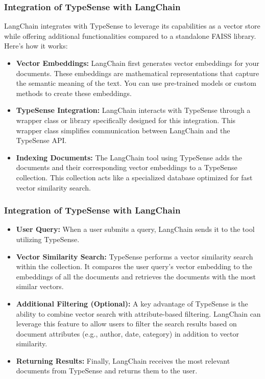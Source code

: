 \documentclass{beamer}
\begin{document}
	\begin{frame}
		\frametitle{Integration of TypeSense with LangChain}
		LangChain integrates with TypeSense to leverage its capabilities as a vector store while offering additional functionalities compared to a standalone FAISS library. Here's how it works:
		\begin{itemize}
			\item \textbf{Vector Embeddings:} LangChain first generates vector embeddings for your documents. These embeddings are mathematical representations that capture the semantic meaning of the text. You can use pre-trained models or custom methods to create these embeddings.
			\item \textbf{TypeSense Integration:} LangChain interacts with TypeSense through a wrapper class or library specifically designed for this integration. This wrapper class simplifies communication between LangChain and the TypeSense API.
			\item \textbf{Indexing Documents:} The LangChain tool using TypeSense adds the documents and their corresponding vector embeddings to a TypeSense collection. This collection acts like a specialized database optimized for fast vector similarity search.
		\end{itemize}
	\end{frame}

	\begin{frame}
		\frametitle{Integration of TypeSense with LangChain}
	
		\begin{itemize}
			\item \textbf{User Query:} When a user submits a query, LangChain sends it to the tool utilizing TypeSense.
			\item \textbf{Vector Similarity Search:} TypeSense performs a vector similarity search within the collection. It compares the user query's vector embedding to the embeddings of all the documents and retrieves the documents with the most similar vectors.
			\item \textbf{Additional Filtering (Optional):} A key advantage of TypeSense is the ability to combine vector search with attribute-based filtering. LangChain can leverage this feature to allow users to filter the search results based on document attributes (e.g., author, date, category) in addition to vector similarity.
			\item \textbf{Returning Results:} Finally, LangChain receives the most relevant documents from TypeSense and returns them to the user.
		\end{itemize}
	\end{frame}
	
\end{document}
